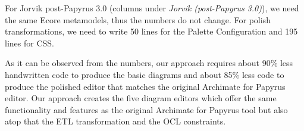 For Jorvik post-Papyrus 3.0 (columns under \textit{Jorvik (post-Papyrus 3.0)}), we need the same Ecore metamodels, thus the numbers do not change. 
For polish transformations, we need to write 50 lines for the Palette Configuration and 195 lines for CSS. 

As it can be observed from the numbers, our approach requires about 90\% less handwritten code to produce the basic diagrams and about 85\% less code to 
produce the polished editor that matches the original Archimate for Papyrus editor. 
Our approach creates the five diagram editors which offer the same functionality and features as the original Archimate for Papyrus tool but also atop that the ETL transformation and the OCL constraints.

